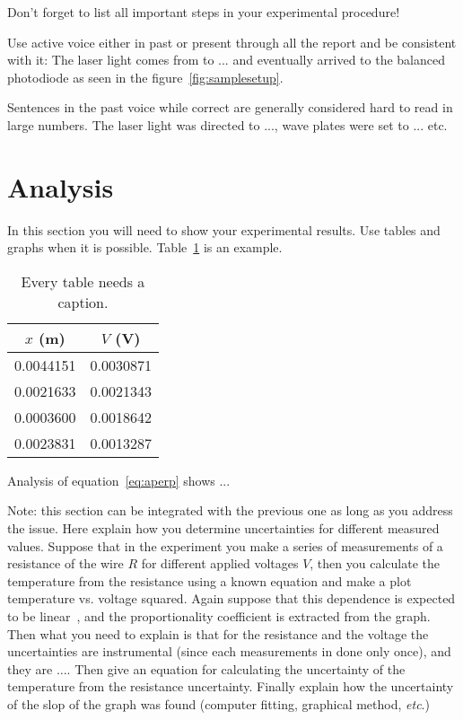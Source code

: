 \documentclass[letterpaper,12pt]{article}
\begin{document}
Don't forget to list all important steps in your experimental procedure!

Use active voice either in past or present through all the report and be
consistent with it:
The laser light comes  from to ... and eventually arrived to the
balanced photodiode as seen in the figure~\ref{fig:samplesetup}.

Sentences in the past voice while correct are generally considered hard to read
in large numbers. The laser light was directed to ..., wave plates were set
to ... etc.


\section{Analysis}

In this section you will need to show your experimental results. Use tables and
graphs when it is possible. Table~\ref{tbl:bins} is an example.

\begin{table}[ht]
\begin{center}
\caption{Every table needs a caption.}
\label{tbl:bins} %
\begin{tabular}{|cc|} 
\hline
\multicolumn{1}{|c}{$x$ (m)} & \multicolumn{1}{c|}{$V$ (V)} \\
\hline
0.0044151 &   0.0030871 \\
0.0021633 &   0.0021343 \\
0.0003600 &   0.0018642 \\
0.0023831 &   0.0013287 \\
\hline
\end{tabular}
\end{center}
\end{table}

Analysis of equation~\ref{eq:aperp} shows ...

Note: this section can be integrated with the previous one as long as you
address the issue. Here explain how you determine uncertainties for different
measured values. Suppose that in the experiment you make a series of
measurements of a resistance of the wire $R$ for different applied voltages
$V$, then you calculate the temperature from the resistance using a known
equation and make a plot  temperature vs. voltage squared. Again suppose that
this dependence is expected to be linear~\cite{Cyr}, and the proportionality coefficient
is extracted from the graph. Then what you need to explain is that for the
resistance and the voltage the uncertainties are instrumental (since each
measurements in done only once), and they are $\dots$. Then give an equation
for calculating the uncertainty of the temperature from the resistance
uncertainty. Finally explain how the uncertainty of the slop of the graph was
found (computer fitting, graphical method, \emph{etc}.)
\end{document}
